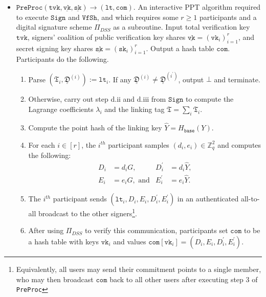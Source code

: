 \documentclass[11pt]{article}
\theoremstyle{definition}
\newcommand{\sk}{\texttt{sk}}
\newcommand{\vk}{\texttt{vk}}
\newcommand{\lt}{\texttt{lt}}
\newcommand{\tvk}{\texttt{tvk}}
\newcommand{\SK}{\underline{\texttt{sk}}}
\newcommand{\VK}{\underline{\texttt{vk}}}
\newcommand{\Zq}{\mathbb{Z}_q}
\newcommand{\preproc}{\texttt{PreProc}}
\newcommand{\sign}{\texttt{Sign}}
\newcommand{\verifyshare}{\texttt{VfSh}}
\begin{document}
\begin{itemize}
\item $\preproc(\tvk, \VK, \SK) \to (\lt,  \texttt{com})$. An interactive PPT algorithm required to execute $\sign$ and $\verifyshare$, and which requires some $r \geq 1$ participants and a digital signature scheme $\Pi_{DSS}$ as a subroutine. Input total verification key $\tvk$, signers' coalition of public verification key shares $\VK = (\vk_i)_{i=1}^{r}$, and secret signing key shares $\SK = (\sk_i)_{i=1}^{r}$. Output a hash table $\texttt{com}$. 
 Participants do the following. 
\begin{enumerate}
\item Parse $(\mathfrak{T}_i, \underline{\mathfrak{D}}^{(i)}) := \lt_i$. If any $\underline{\mathfrak{D}}^{(i)} \neq \underline{\mathfrak{D}}^{(i^\prime)}$, output $\bot$ and terminate. 
\item Otherwise, carry out step d.ii and d.iii from $\sign$ to compute the Lagrange coefficients $\lambda_i$ and the linking tag $\mathfrak{T} = \sum_i \mathfrak{T}_i$.
\item Compute the point hash of the linking key $\widehat{Y} = H_{\texttt{base}}(Y)$.
\item For each $i \in [r]$, the $i^{th}$ participant samples $(d_i, e_i) \in \Zq^2$ and computes the following:
\begin{align*}
D_i &= d_i G, & D_i^\prime &= d_i \widehat{Y}, \\
E_i &= e_i G,\text{ and} &
E_i^\prime &= e_i \widehat{Y}.
\end{align*}
\item The $i^{th}$ participant sends $(\lt_i, D_i, E_i, D^\prime_i, E^\prime_i)$ in an authenticated all-to-all broadcast to the other signers\footnote{Equivalently, all users may send their commitment points to a single member, who may then broadcast $\texttt{com}$ back to all other users after executing step 3 of \texttt{PreProc}}.
\item After using $\Pi_{DSS}$ to verify this communication, participants set $\texttt{com}$ to be a hash table with keys $\vk_i$ and values $\texttt{com}[\vk_i] = (D_i, E_i, D^\prime_i, E^\prime_i)$.
\end{enumerate}
\end{itemize}

\end{document}

